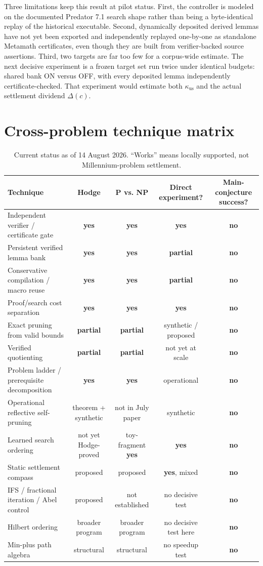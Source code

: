 \documentclass[11pt]{article}
\newcommand{\kuse}{\kappa_{\mathrm{us}}}
\newcommand{\yes}{\textbf{yes}}
\newcommand{\no}{\textbf{no}}
\newcommand{\partialyes}{\textbf{partial}}
\begin{document}
Three limitations keep this result at pilot status.  First, the controller is modeled on the documented Predator 7.1 search shape rather than being a byte-identical replay of the historical executable.  Second, dynamically deposited derived lemmas have not yet been exported and independently replayed one-by-one as standalone Metamath certificates, even though they are built from verifier-backed source assertions.  Third, two targets are far too few for a corpus-wide estimate.  The next decisive experiment is a frozen target set run twice under identical budgets: shared bank ON versus OFF, with every deposited lemma independently certificate-checked.  That experiment would estimate both \(\kuse\) and the actual settlement dividend \(\Delta(c)\).

\section{Cross-problem technique matrix}

\begin{table}[H]
\centering
\small
\caption{Current status as of 14 August 2026.  ``Works'' means locally supported, not Millennium-problem settlement.}
\begin{tabularx}{\textwidth}{@{}Xcccc@{}}
\toprule
Technique & Hodge & P vs. NP & Direct experiment? & Main-conjecture success? \\
\midrule
Independent verifier / certificate gate & \yes & \yes & \yes & \no \\
Persistent verified lemma bank & \yes & \yes & \partialyes & \no \\
Conservative compilation / macro reuse & \yes & \yes & \partialyes & \no \\
Proof/search cost separation & \yes & \yes & \yes & \no \\
Exact pruning from valid bounds & \partialyes & \partialyes & synthetic / proposed & \no \\
Verified quotienting & \partialyes & \partialyes & not yet at scale & \no \\
Problem ladder / prerequisite decomposition & \yes & \yes & operational & \no \\
Operational reflective self-pruning & theorem + synthetic & not in July paper & synthetic & \no \\
Learned search ordering & not yet Hodge-proved & toy-fragment \yes & \yes & \no \\
Static settlement compass & proposed & proposed & \yes, mixed & \no \\
IFS / fractional iteration / Abel control & proposed & not established & no decisive test & \no \\
Hilbert ordering & broader program & broader program & no decisive test here & \no \\
Min-plus path algebra & structural & structural & no speedup test & \no \\
\bottomrule
\end{tabularx}
\end{table}
\end{document}
